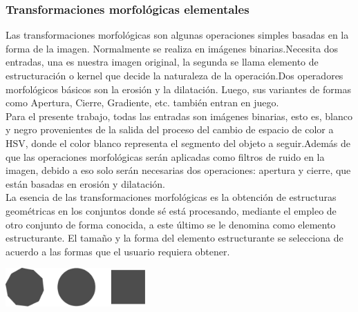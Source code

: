 \subsubsection{Transformaciones morfológicas elementales}
Las transformaciones morfológicas son algunas operaciones simples basadas en la forma de la imagen. Normalmente se realiza en
imágenes binarias.Necesita dos entradas, una es nuestra imagen original, la segunda se llama elemento de estructuración o
kernel que decide la naturaleza de la operación.Dos operadores morfológicos básicos son la erosión y la dilatación. Luego,
sus variantes de formas como Apertura, Cierre, Gradiente, etc. también entran en juego. \cite{WEB:Ieeeucsa2019}\\
Para el presente trabajo, todas las entradas son imágenes binarias, esto es, blanco y negro provenientes de la salida
del proceso del cambio de espacio de color a HSV, donde el color blanco representa el segmento del objeto a seguir.Además de que
las operaciones morfológicas serán aplicadas como filtros de ruido en la imagen, debido a eso solo serán necesarias dos operaciones:
apertura y cierre, que están basadas en erosión y dilatación.\\
La esencia de las transformaciones morfológicas es la obtención de estructuras geométricas en los conjuntos donde sé está procesando,
mediante el empleo de otro conjunto de forma conocida, a este último se le denomina como elemento estructurante.
El tamaño y la forma del elemento estructurante se selecciona de acuerdo a las formas que el usuario requiera obtener.
\begin{center}
	\includegraphics[width=0.4\textwidth]{Contenido/Cuerpo/Capitulo2/Fig13.eps}
	\label{fig:MarcoTeorico:Fig22}
\end{center}


